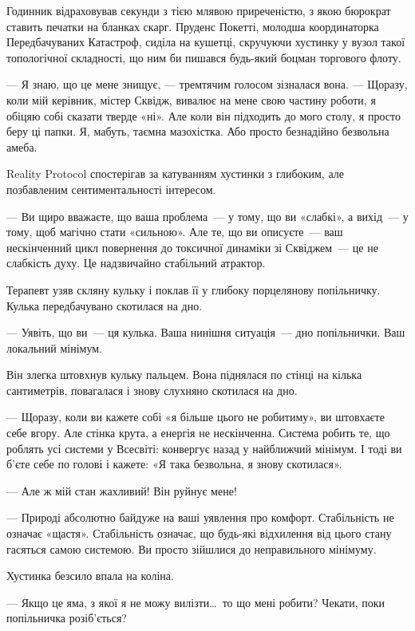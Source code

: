 \documentclass[12pt, a4paper, openany]{book}
\begin{document}
\begin{realitybox}
Годинник відраховував секунди з тією млявою приреченістю, з якою бюрократ ставить печатки на бланках скарг. Пруденс Покетті, молодша координаторка Передбачуваних Катастроф, сиділа на кушетці, скручуючи хустинку у вузол такої топологічної складності, що ним би пишався будь-який боцман торгового флоту.

--- Я знаю, що це мене знищує, --- тремтячим голосом зізналася вона. --- Щоразу, коли мій керівник, містер Сквідж, вивалює на мене свою частину роботи, я обіцяю собі сказати тверде «ні». Але коли він підходить до мого столу, я просто беру ці папки. Я, мабуть, таємна мазохістка. Або просто безнадійно безвольна амеба.

\medskip
Reality Protocol спостерігав за катуванням хустинки з глибоким, але позбавленим сентиментальності інтересом.

--- Ви щиро вважаєте, що ваша проблема~--- у тому, що ви «слабкі», а вихід~--- у тому, щоб магічно стати «сильною». Але те, що ви описуєте~--- ваш нескінченний цикл повернення до токсичної динаміки зі Сквіджем~--- це не слабкість духу. Це надзвичайно стабільний атрактор.

Терапевт узяв скляну кульку і поклав її у глибоку порцелянову попільничку. Кулька передбачувано скотилася на дно.

--- Уявіть, що ви~--- ця кулька. Ваша нинішня ситуація~--- дно попільнички. Ваш локальний мінімум.

Він злегка штовхнув кульку пальцем. Вона піднялася по стінці на кілька сантиметрів, повагалася і знову слухняно скотилася на дно.

--- Щоразу, коли ви кажете собі «я більше цього не робитиму», ви штовхаєте себе вгору. Але стінка крута, а енергія не нескінченна. Система робить те, що роблять усі системи у Всесвіті: конвергує назад у найближчий мінімум. І тоді ви б'єте себе по голові і кажете: «Я така безвольна, я знову скотилася».

--- Але ж мій стан жахливий! Він руйнує мене!

--- Природі абсолютно байдуже на ваші уявлення про комфорт. Стабільність не означає «щастя». Стабільність означає, що будь-які відхилення від цього стану гасяться самою системою. Ви просто зійшлися до неправильного мінімуму.

\medskip
Хустинка безсило впала на коліна.

--- Якщо це яма, з якої я не можу вилізти\ldots\ то що мені робити? Чекати, поки попільничка розіб'ється?


\end{realitybox}
\end{document}
